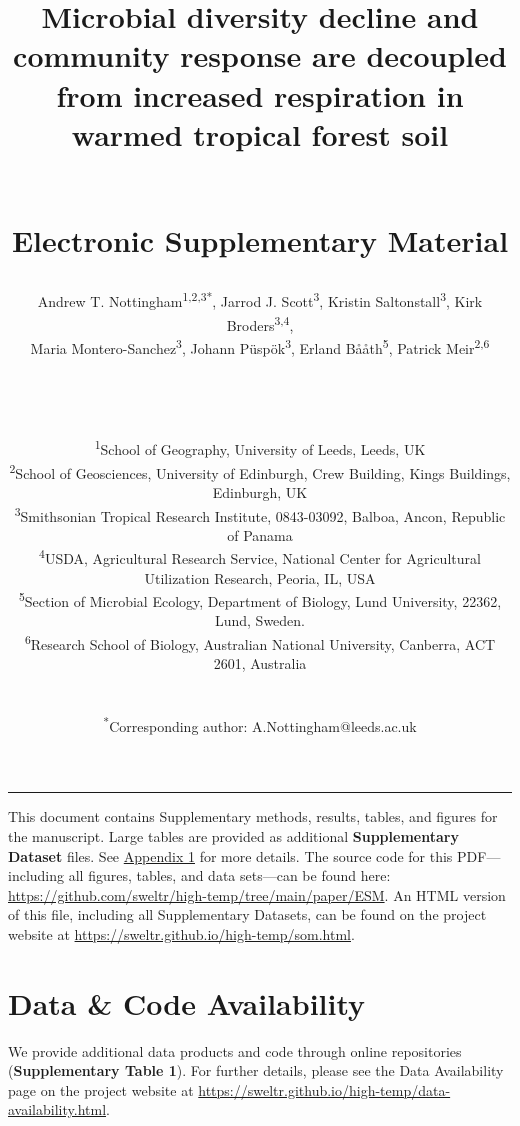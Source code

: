 \documentclass[
  10pt,
  letterpaper,
  DIV=11,
  numbers=noendperiod]{scrartcl}
\date{}
\title{\LARGE Microbial diversity decline and community response are
decoupled from increased respiration in warmed tropical forest soil\\
\strut \\
Electronic Supplementary Material}
\author{Andrew T. Nottingham\textsuperscript{1,2,3*}, Jarrod J.
Scott\textsuperscript{3}, Kristin Saltonstall\textsuperscript{3}, Kirk
Broders\textsuperscript{3,4},\\
Maria Montero-Sanchez\textsuperscript{3}, Johann
Püspök\textsuperscript{3}, Erland Bååth\textsuperscript{5}, Patrick
Meir\textsuperscript{2,6}\\
\strut \\
\strut \\
\RaggedRight \small \textsuperscript{1}School of Geography, University
of Leeds, Leeds, UK\\
\small \textsuperscript{2}School of Geosciences, University of
Edinburgh, Crew Building, Kings Buildings, Edinburgh, UK\\
\small \textsuperscript{3}Smithsonian Tropical Research Institute,
0843-03092, Balboa, Ancon, Republic of Panama\\
\small \textsuperscript{4}USDA, Agricultural Research Service, National
Center for Agricultural Utilization Research, Peoria, IL, USA\\
\small \textsuperscript{5}Section of Microbial Ecology, Department of
Biology, Lund University, 22362, Lund, Sweden.\\
\small \textsuperscript{6}Research School of Biology, Australian
National University, Canberra, ACT 2601, Australia\\
\strut \\
\small \textsuperscript{*}Corresponding author:
A.Nottingham@leeds.ac.uk}
\date{}
\renewcommand*\contentsname{Table of contents}
\newcommand\contentsname{Table of contents}
\begin{document}
\maketitle
\ifdefined\Shaded\renewenvironment{Shaded}{\begin{tcolorbox}[borderline west={3pt}{0pt}{shadecolor}, boxrule=0pt, breakable, sharp corners, enhanced, frame hidden, interior hidden]}{\end{tcolorbox}}\fi

\renewcommand*\contentsname{Contents}
{
\hypersetup{linkcolor=}
\setcounter{tocdepth}{2}
\tableofcontents
}
\listoffigures
\listoftables
\begin{center}\rule{0.5\linewidth}{0.5pt}\end{center}

\begin{tcolorbox}[enhanced jigsaw, opacityback=0, left=2mm, breakable, bottomrule=.15mm, colframe=quarto-callout-note-color-frame, colback=white, leftrule=.75mm, toprule=.15mm, arc=.35mm, rightrule=.15mm]
This document contains Supplementary methods, results, tables, and
figures for the manuscript. Large tables are provided as additional
\textbf{Supplementary Dataset} files. See
\hyperref[appendix-1]{\color{blue}Appendix 1} for more details. The
source code for this PDF---including all figures, tables, and data
sets---can be found here:
\url{https://github.com/sweltr/high-temp/tree/main/paper/ESM}. An HTML
version of this file, including all Supplementary Datasets, can be found
on the project website at
\url{https://sweltr.github.io/high-temp/som.html}.
\end{tcolorbox}

\hypertarget{data-code-availability}{%
\section{Data \& Code Availability}\label{data-code-availability}}

We provide additional data products and code through online repositories
(\textbf{Supplementary Table 1}). For further details, please see the
Data Availability page on the project website at
\url{https://sweltr.github.io/high-temp/data-availability.html}.
\end{document}
